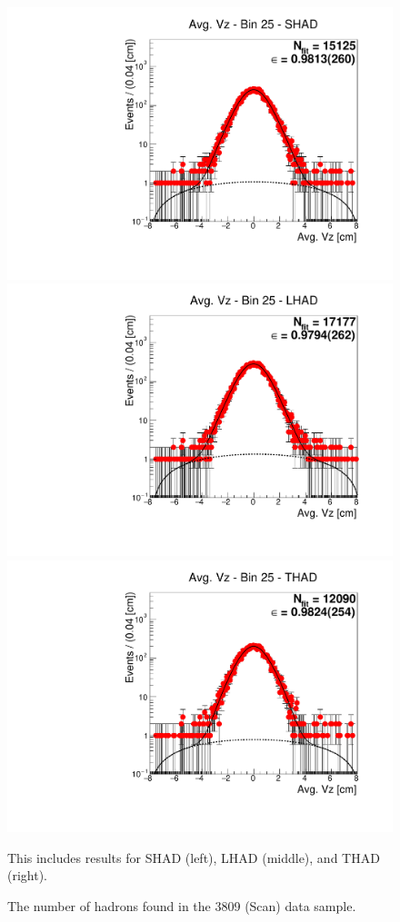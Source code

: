 \begin{figure}[H]
\centering
\includegraphics[scale=0.25]{figures/plots/nonDDbar_fit_results/scan/fit_scan_25_data_SHAD.pdf}
\hspace{-0.5cm}
\includegraphics[scale=0.25]{figures/plots/nonDDbar_fit_results/scan/fit_scan_25_data_LHAD.pdf}
\hspace{-0.5cm}
\includegraphics[scale=0.25]{figures/plots/nonDDbar_fit_results/scan/fit_scan_25_data_THAD.pdf}
\caption{The number of hadrons found in the 3809 (Scan) data sample.}
{This includes results for SHAD (left), LHAD (middle), and THAD (right).}
\label{fig:hadron_fits_scan_25}
\end{figure}

